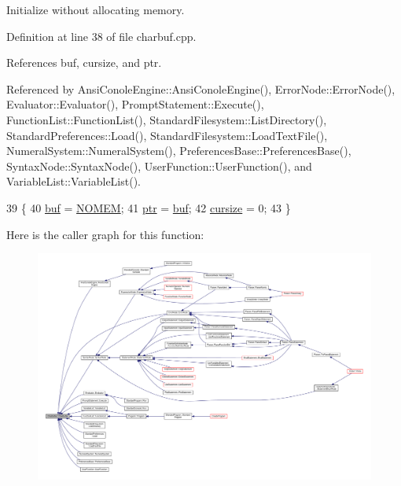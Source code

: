 Initialize without allocating memory. 



Definition at line 38 of file charbuf.\+cpp.



References buf, cursize, and ptr.



Referenced by Ansi\+Conole\+Engine\+::\+Ansi\+Conole\+Engine(), Error\+Node\+::\+Error\+Node(), Evaluator\+::\+Evaluator(), Prompt\+Statement\+::\+Execute(), Function\+List\+::\+Function\+List(), Standard\+Filesystem\+::\+List\+Directory(), Standard\+Preferences\+::\+Load(), Standard\+Filesystem\+::\+Load\+Text\+File(), Numeral\+System\+::\+Numeral\+System(), Preferences\+Base\+::\+Preferences\+Base(), Syntax\+Node\+::\+Syntax\+Node(), User\+Function\+::\+User\+Function(), and Variable\+List\+::\+Variable\+List().


\begin{DoxyCode}
39 \{
40     \hyperlink{classCharBuffer_a8bcd8491b24db4197b311eb361609674}{buf} = \hyperlink{platform_8h_a46ff2bfbf0d44b8466a2251d5bd5e6f8}{NOMEM};
41     \hyperlink{classCharBuffer_a2d313433650506fd6609e6947729dfb0}{ptr} = \hyperlink{classCharBuffer_a8bcd8491b24db4197b311eb361609674}{buf};
42     \hyperlink{classCharBuffer_ac3265c68505802fbe8b590d5a423b0d0}{cursize} = 0;
43 \}
\end{DoxyCode}


Here is the caller graph for this function\+:\nopagebreak
\begin{figure}[H]
\begin{center}
\leavevmode
\includegraphics[width=350pt]{classCharBuffer_a4345e9a5114f5c0292e8f242f26e3a7b_icgraph}
\end{center}
\end{figure}


